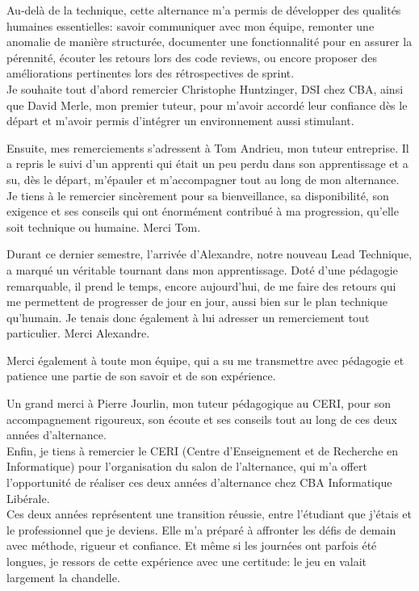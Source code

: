 \documentclass{article}
\begin{document}
Au-delà de la technique, cette alternance m'a permis de développer des qualités humaines essentielles: savoir communiquer avec mon équipe, remonter une anomalie de manière structurée, documenter une fonctionnalité pour en assurer la pérennité, écouter les retours lors des code reviews, ou encore proposer des améliorations pertinentes lors des rétrospectives de sprint. \\

Je souhaite tout d'abord remercier Christophe Huntzinger, DSI chez CBA, ainsi que David Merle, mon premier tuteur, pour m'avoir accordé leur confiance dès le départ et m'avoir permis d'intégrer un environnement aussi stimulant.

Ensuite, mes remerciements s'adressent à Tom Andrieu, mon tuteur entreprise. Il a repris le suivi d'un apprenti qui était un peu perdu dans son apprentissage et a su, dès le départ, m'épauler et m'accompagner tout au long de mon alternance. Je tiens à le remercier sincèrement pour sa bienveillance, sa disponibilité, son exigence et ses conseils qui ont énormément contribué à ma progression, qu'elle soit technique ou humaine. Merci Tom.

Durant ce dernier semestre, l'arrivée d'Alexandre, notre nouveau Lead Technique, a marqué un véritable tournant dans mon apprentissage. Doté d'une pédagogie remarquable, il prend le temps, encore aujourd'hui, de me faire des retours qui me permettent de progresser de jour en jour, aussi bien sur le plan technique qu'humain. Je tenais donc également à lui adresser un remerciement tout particulier. Merci Alexandre.

Merci également à toute mon équipe, qui a su me transmettre avec pédagogie et patience une partie de son savoir et de son expérience.

Un grand merci à Pierre Jourlin, mon tuteur pédagogique au CERI, pour son accompagnement rigoureux, son écoute et ses conseils tout au long de ces deux années d'alternance. \\

Enfin, je tiens à remercier le CERI (Centre d'Enseignement et de Recherche en Informatique) pour l'organisation du salon de l'alternance, qui m'a offert l'opportunité de réaliser ces deux années d'alternance chez CBA Informatique Libérale. \\

Ces deux années représentent une transition réussie, entre l'étudiant que j'étais et le professionnel que je deviens. Elle m'a préparé à affronter les défis de demain avec méthode, rigueur et confiance. Et même si les journées ont parfois été longues, je ressors de cette expérience avec une certitude: le jeu en valait largement la chandelle.
\end{document}
